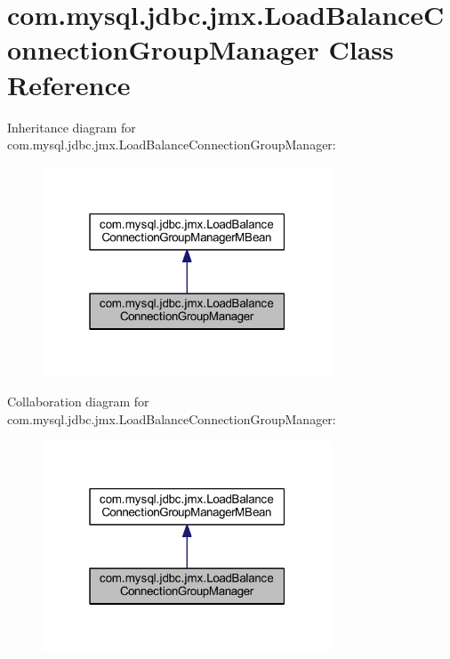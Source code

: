 \hypertarget{classcom_1_1mysql_1_1jdbc_1_1jmx_1_1_load_balance_connection_group_manager}{}\section{com.\+mysql.\+jdbc.\+jmx.\+Load\+Balance\+Connection\+Group\+Manager Class Reference}
\label{classcom_1_1mysql_1_1jdbc_1_1jmx_1_1_load_balance_connection_group_manager}


Inheritance diagram for com.\+mysql.\+jdbc.\+jmx.\+Load\+Balance\+Connection\+Group\+Manager\+:
\nopagebreak
\begin{figure}[H]
\begin{center}
\leavevmode
\includegraphics[width=244pt]{classcom_1_1mysql_1_1jdbc_1_1jmx_1_1_load_balance_connection_group_manager__inherit__graph}
\end{center}
\end{figure}


Collaboration diagram for com.\+mysql.\+jdbc.\+jmx.\+Load\+Balance\+Connection\+Group\+Manager\+:
\nopagebreak
\begin{figure}[H]
\begin{center}
\leavevmode
\includegraphics[width=244pt]{classcom_1_1mysql_1_1jdbc_1_1jmx_1_1_load_balance_connection_group_manager__coll__graph}
\end{center}
\end{figure}
